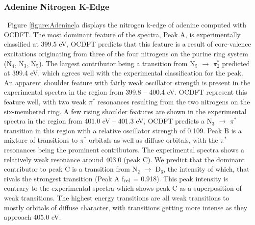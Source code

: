 \documentclass[8.5pt,twoside,twocolumn]{article}
\begin{document}
\subsubsection{Adenine Nitrogen K-Edge}
   \ Figure \ref{figure:Adenine}a displays the nitrogen k-edge of adenine computed with OCDFT. The most dominant feature of the spectra, Peak A, is experimentally classified at 399.5 eV, OCDFT predicts that this feature is a result of core-valence excitations originating from three of the four nitrogens on the purine ring system (N$_4$, N$_3$, N$_5$). The largest contributor being a transition from N$_5$ $\rightarrow$ $\pi_2^*$ predicted at 399.4 eV, which agrees well with the experimental classification for the peak. An apparent shoulder feature with fairly weak oscillator strength is present in the experimental spectra in the region from 399.8 -- 400.4 eV. OCDFT represent this feature well, with two weak $\pi^*$ resonances resulting from the two nitrogens on the six-membered ring. A few rising shoulder features are shown in the experimental spectra in the region from 401.0 eV -- 401.3 eV, OCDFT predicts a N$_3$ $\rightarrow$ $\pi^*$ transition in this region with a relative oscillator strength of 0.109. Peak B is a mixture of transitions to $\pi^*$ orbitals as well as diffuse orbitals, with the $\pi^*$ resonances being the prominent contributors. 
The experimental spectra shows a relatively weak resonance around 403.0 (peak C).  We predict that the dominant contributor to peak C is a transition from N$_2$ $\rightarrow$ D$_6$, the intensity of which, that rivals the strongest transition (Peak A f$_{\rm rel}$ = 0.918). This peak intensity is contrary to the experimental spectra which shows peak C  as a superposition of weak transitions. The highest energy transitions are all weak transitions to mostly orbitals of diffuse character, with transitions getting more intense as they approach 405.0 eV. 
\end{document}
